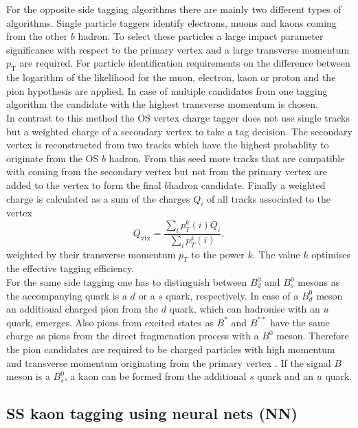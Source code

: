 \documentclass{PoS}
\begin{document}
For the opposite side tagging algorithms there are mainly two different types of algorithms. Single particle taggers identify electrons, muons and kaons coming from the other $b$ hadron. To select these particles a large impact parameter significance  with respect to the primary vertex and a large transverse momentum $p_\text{T}$ are required. For particle identification requirements on the difference between the logarithm of the likelihood for the muon, electron, kaon or proton and the pion hypothesis are applied. In case of multiple candidates from one tagging algorithm the candidate with the highest transverse momentum is chosen.\\
In contrast to this method the OS vertex charge tagger does not use single tracks but a weighted charge of a secondary vertex to take a tag decision. The secondary vertex is reconstructed from two tracks which have the highest probablity to originate from the OS $b$ hadron. From this seed more tracks that are compatible with coming from the secondary vertex but not from the primary vertex are added to the vertex to form the final $b$hadron candidate. Finally a weighted charge is calculated as a sum of the charges $Q_i$ of all tracks associated to the vertex
\begin{equation}
Q_\text{vtx}=\frac{\sum_i p_T^k(i)Q_i}{\sum_i p_T^k(i)},
\end{equation} 
weighted by their transverse momentum $p_T$ to the power $k$. The value $k$ optimises the effective tagging efficiency.\\
For the same side tagging one has to distinguish between $B_d^0$ and $B_s^0$ mesons as the accompanying quark is a $d$ or a $s$ quark, respectively. In case of a $B_d^0$ meson an additional charged pion from the $d$ quark, which can hadronise with an $u$ quark, emerges. Also pions from excited states as $B^*$ and $B^{**}$ have the same charge as pions from the direct fragmenation process with a $B^0$ meson. Therefore the pion candidates are required to be charged particles with high momentum and transverse momentum originating from the primary vertex \cite{10}. If the signal $B$ meson is a $B_s^0$, a kaon can be formed from the additional $s$ quark and an $u$ quark.\\

\subsection{SS kaon tagging using neural nets (NN)}
\end{document}
